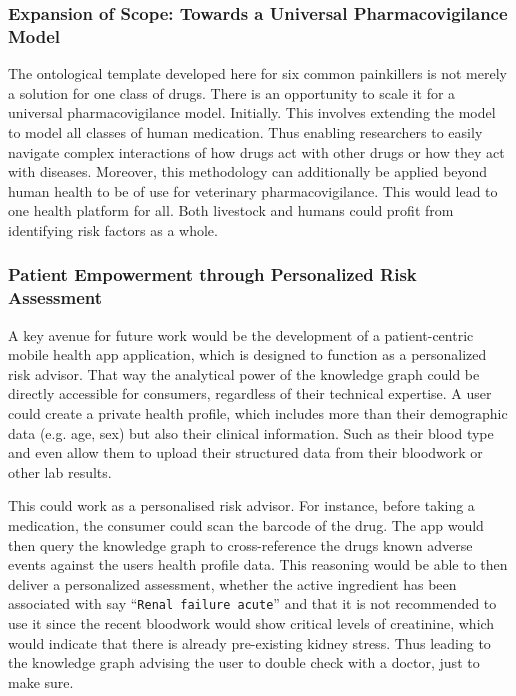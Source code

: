 \subsubsection*{Expansion of Scope: Towards a Universal Pharmacovigilance Model}
The ontological template developed here for six common painkillers is not merely a solution for one class of drugs. There is an opportunity to scale it for a universal pharmacovigilance model. Initially. This involves extending the model to model all classes of human medication. Thus enabling researchers to easily navigate complex interactions of how drugs act with other drugs or how they act with diseases. Moreover, this methodology can additionally be applied beyond human health to be of use for veterinary pharmacovigilance. This would lead to one health platform for all. Both livestock and humans could profit from identifying risk factors as a whole.

\subsubsection*{Patient Empowerment through Personalized Risk Assessment}
A key avenue for future work would be the development of a patient-centric mobile health app application, which is designed to function as a personalized risk advisor. That way the analytical power of the knowledge graph could be directly accessible for consumers, regardless of their technical expertise. A user could create a private health profile, which includes more than their demographic data (e.g. age, sex) but also their clinical information. Such as their blood type and even allow them to upload their structured data from their bloodwork or other lab results.

This could work as a personalised risk advisor. For instance, before taking a medication, the consumer could scan the barcode of the drug. The app would then query the knowledge graph to cross-reference the drugs known adverse events against the users health profile data. This reasoning would be able to then deliver a personalized assessment, whether the active ingredient has been associated with say ``\texttt{Renal failure acute}'' and that it is not recommended to use it since the recent bloodwork would show critical levels of creatinine, which would indicate that there is already pre-existing kidney stress. Thus leading to the knowledge graph advising the user to double check with a doctor, just to make sure.

